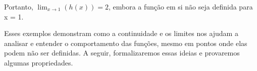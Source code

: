 \documentclass{article}
\begin{document}
\begin{enumerate}
    Portanto, $\lim_{x \to 1} (h(x)) = 2$, embora a função em si não seja definida para x = 1.

    \begin{center}
    \end{center}
\end{enumerate}

Esses exemplos demonstram como a continuidade e os limites nos ajudam a analisar e entender o comportamento das funções, mesmo em pontos onde elas podem não ser definidas. 
A seguir, formalizaremos essas ideias e provaremos algumas propriedades.
\end{document}
